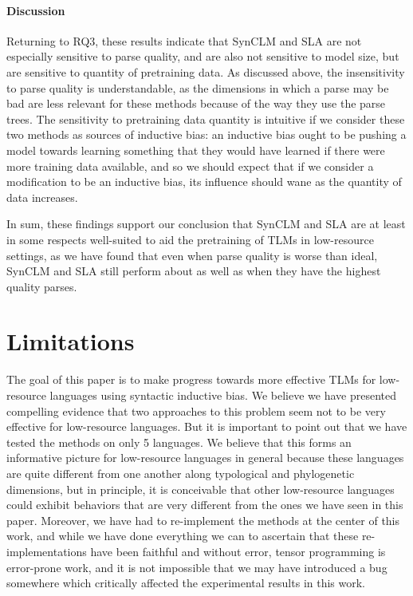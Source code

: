 \documentclass[11pt]{article}
\begin{document}
\paragraph{Discussion}
Returning to RQ3, these results indicate that SynCLM and SLA are not especially sensitive to parse quality, and are also not sensitive to model size, but are sensitive to quantity of pretraining data.
As discussed above, the insensitivity to parse quality is understandable, as the dimensions in which a parse may be bad are less relevant for these methods because of the way they use the parse trees.
The sensitivity to pretraining data quantity is intuitive if we consider these two methods as sources of inductive bias: an inductive bias ought to be pushing a model towards learning something that they would have learned if there were more training data available, and so we should expect that if we consider a modification to be an inductive bias, its influence should wane as the quantity of data increases.

In sum, these findings support our conclusion that SynCLM and SLA are at least in some respects well-suited to aid the pretraining of TLMs in low-resource settings, as we have found that even when parse quality is worse than ideal, SynCLM and SLA still perform about as well as when they have the highest quality parses.

\section{Limitations}
The goal of this paper is to make progress towards more effective TLMs for low-resource languages using syntactic inductive bias.
We believe we have presented compelling evidence that two approaches to this problem seem not to be very effective for low-resource languages.
But it is important to point out that we have tested the methods on only 5 languages.
We believe that this forms an informative picture for low-resource languages in general because these languages are quite different from one another along typological and phylogenetic dimensions, but in principle, it is conceivable that other low-resource languages could exhibit behaviors that are very different from the ones we have seen in this paper.
Moreover, we have had to re-implement the methods at the center of this work, and while we have done everything we can to ascertain that these re-implementations have been faithful and without error, tensor programming is error-prone work, and it is not impossible that we may have introduced a bug somewhere which critically affected the experimental results in this work.
\end{document}
